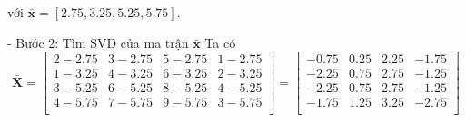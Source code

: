 \documentclass[12pt,a4paper,oneside]{report}
\numberwithin{equation}{section}
\begin{document}
với $\bar{\mathbf{x}} = \left[ 2.75, 3.25, 5.25, 5.75 \right]$.

- Bước 2: Tìm SVD của ma trận $\bar{\mathbf{x}}$
Ta có
$$
\bar{\mathbf{X}}=\begin{bmatrix}
	2-2.75 & 3-2.75 & 5-2.75 & 1-2.75 \\
	1-3.25 & 4-3.25 & 6-3.25 & 2-3.25 \\
	3-5.25 & 6-5.25 & 8-5.25 & 4-5.25 \\
	4-5.75 & 7-5.75 & 9-5.75 & 3-5.75 \\
\end{bmatrix} = \begin{bmatrix}
	-0.75 & 0.25 & 2.25 & -1.75 \\
	-2.25 & 0.75 & 2.75 & -1.25 \\
	-2.25 & 0.75 & 2.75 & -1.25 \\
	-1.75 & 1.25 & 3.25 & -2.75 \\
\end{bmatrix}
$$
\end{document}
